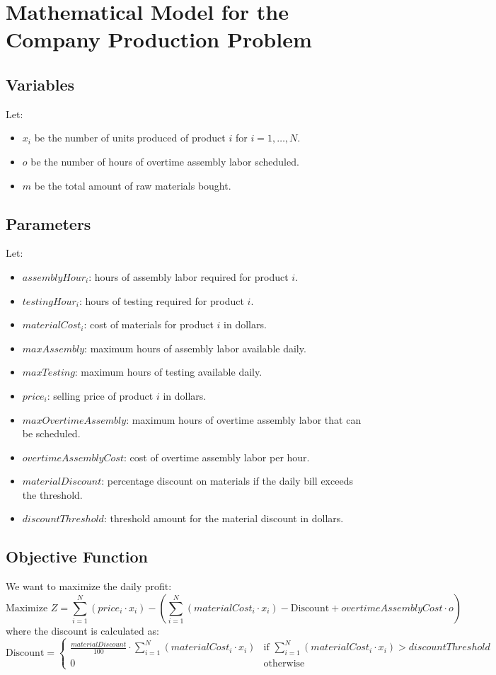 \documentclass{article}
\begin{document}
\section*{Mathematical Model for the Company Production Problem}

\subsection*{Variables}
Let:
\begin{itemize}
    \item $x_i$ be the number of units produced of product $i$ for $i = 1, \ldots, N$.
    \item $o$ be the number of hours of overtime assembly labor scheduled.
    \item $m$ be the total amount of raw materials bought.
\end{itemize}

\subsection*{Parameters}
Let:
\begin{itemize}
    \item $assemblyHour_i$: hours of assembly labor required for product $i$.
    \item $testingHour_i$: hours of testing required for product $i$.
    \item $materialCost_i$: cost of materials for product $i$ in dollars.
    \item $maxAssembly$: maximum hours of assembly labor available daily.
    \item $maxTesting$: maximum hours of testing available daily.
    \item $price_i$: selling price of product $i$ in dollars.
    \item $maxOvertimeAssembly$: maximum hours of overtime assembly labor that can be scheduled.
    \item $overtimeAssemblyCost$: cost of overtime assembly labor per hour.
    \item $materialDiscount$: percentage discount on materials if the daily bill exceeds the threshold.
    \item $discountThreshold$: threshold amount for the material discount in dollars.
\end{itemize}

\subsection*{Objective Function}
We want to maximize the daily profit:
\[
\text{Maximize } Z = \sum_{i=1}^{N} (price_i \cdot x_i) - \left( \sum_{i=1}^{N} (materialCost_i \cdot x_i) - \text{Discount} + overtimeAssemblyCost \cdot o \right)
\]
where the discount is calculated as:
\[
\text{Discount} = 
\begin{cases} 
\frac{materialDiscount}{100} \cdot \sum_{i=1}^{N} (materialCost_i \cdot x_i) & \text{if } \sum_{i=1}^{N} (materialCost_i \cdot x_i) > discountThreshold \\
0 & \text{otherwise}
\end{cases}
\]
\end{document}
